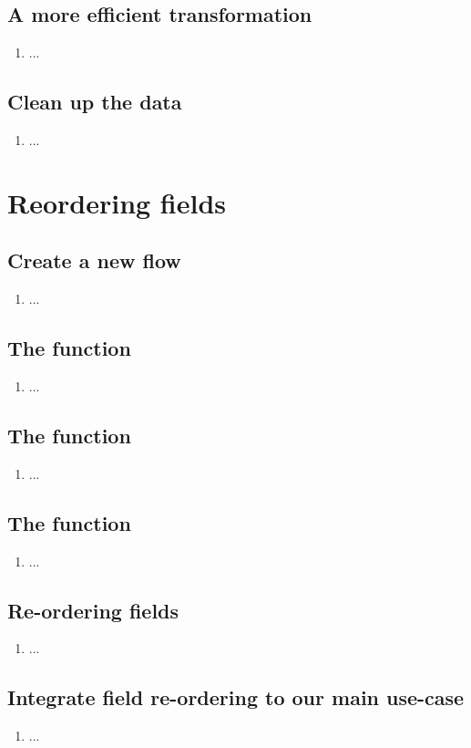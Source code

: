 \subsection{A more efficient transformation}
\begin{enumerate}[resume*]
\item ...
\end{enumerate}

\subsection{Clean up the data}
\begin{enumerate}[resume*]
\item ...
\end{enumerate}

\section{Reordering fields}

\subsection{Create a new flow}
\begin{enumerate}
\item ...
\end{enumerate}

\subsection{The  function}
\begin{enumerate}[resume*]
\item ...
\end{enumerate}

\subsection{The  function}
\begin{enumerate}[resume*]
\item ...
\end{enumerate}

\subsection{The  function}
\begin{enumerate}[resume*]
\item ...
\end{enumerate}

\subsection{Re-ordering fields}
\begin{enumerate}[resume*]
\item ...
\end{enumerate}

\subsection{Integrate field re-ordering to our main use-case}
\begin{enumerate}[resume*]
\item ...
\end{enumerate}
